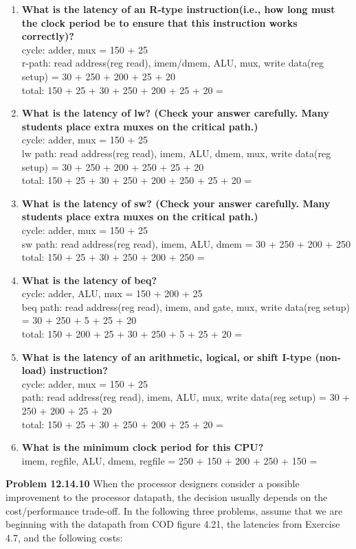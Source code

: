 \documentclass{article}
\begin{document}
    \begin{enumerate}[label=(\alph*)]
        \item \textbf{What is the latency of an R-type instruction(i.e., how long must the clock period be to ensure that this instruction works correctly)?}
        \\
        cycle: adder, mux = 150 + 25\\
        r-path: read address(reg read), imem/dmem, ALU, mux, write data(reg setup) = 30 + 250 + 200 + 25 + 20\\
        total: 150 + 25 + 30 + 250 + 200 + 25 + 20 = 
        \item \textbf{What is the latency of lw? (Check your answer carefully. Many students place extra muxes on the critical path.)}
        \\
        cycle: adder, mux = 150 + 25\\
        lw path: read address(reg read), imem, ALU, dmem, mux, write data(reg setup) = 30 + 250 + 200 + 250 + 25 + 20\\
        total: 150 + 25 + 30 + 250 + 200 + 250 + 25 + 20 = 
        \item \textbf{What is the latency of sw? (Check your answer carefully. Many students place extra muxes on the critical path.)}
        \\
        cycle: adder, mux = 150 + 25\\
        sw path: read address(reg read), imem, ALU, dmem = 30 + 250 + 200 + 250\\
        total: 150 + 25 + 30 + 250 + 200 + 250 = 
        \item \textbf{What is the latency of beq?}
        \\
        cycle: adder, ALU, mux = 150 + 200 + 25\\
        beq path: read address(reg read), imem, and gate, mux, write data(reg setup) = 30 + 250 + 5 + 25 + 20\\
        total: 150 + 200 + 25 + 30 + 250 + 5 + 25 + 20 = 
        \item \textbf{What is the latency of an arithmetic, logical, or shift I-type (non-load) instruction?}
        \\
        cycle: adder, mux = 150 + 25\\
        path: read address(reg read), imem, ALU, mux, write data(reg setup) = 30 + 250 + 200 + 25 + 20\\
        total: 150 + 25 + 30 + 250 + 200 + 25 + 20 = 
        \item \textbf{What is the minimum clock period for this CPU?}
        \\
        imem, regfile, ALU, dmem, regfile = 250 + 150 + 200 + 250 + 150 = 
    \end{enumerate}
    \textbf{Problem 12.14.10} When the processor designers consider a possible improvement to the processor datapath, the decision usually depends on the cost/performance trade-off. In the following three problems, assume that we are beginning with the datapath from COD figure 4.21, the latencies from Exercise 4.7, and the following costs:
    
\end{document}
